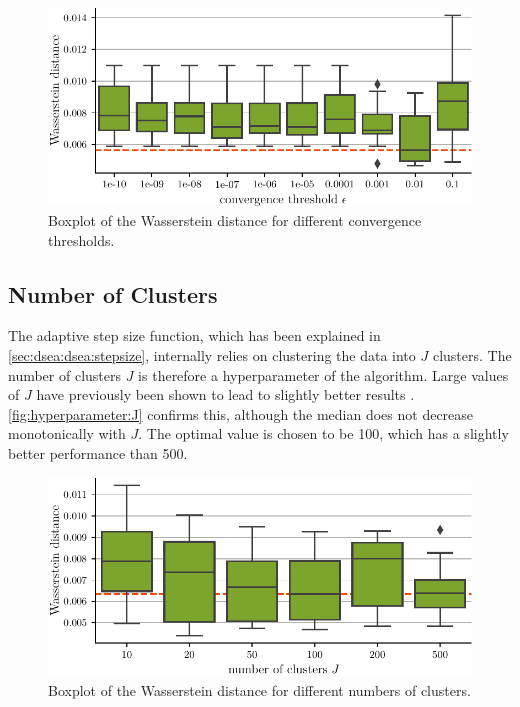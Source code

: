 \begin{figure}
  \centering
  \includegraphics[width=\textwidth]{content/plots/hyperparam/epsilon_vs_wd_boxplot_lessheight.pdf}
  \caption{Boxplot of the Wasserstein distance for different convergence thresholds.}
  \label{fig:hyperparameter:epsilon}
\end{figure}


\subsection{Number of Clusters}
The adaptive step size function,
  which has been explained in \autoref{sec:dsea:dsea:stepsize},
internally relies on clustering the data into $J$ clusters.
The number of clusters $J$ is therefore a hyperparameter of the algorithm.
%
Large values of $J$ have previously been shown to lead to slightly better results \cite{dsea_mirko}.
\autoref{fig:hyperparameter:J} confirms this,
although the median does not decrease monotonically with $J$.
The optimal value is chosen to be \num{100},
which has a slightly better performance than \num{500}.

\begin{figure}
  \centering
  \includegraphics[scale=1]{content/plots/hyperparam/J_vs_wd_boxplot_lessheight.pdf}
  \caption{Boxplot of the Wasserstein distance for different numbers of clusters.}
  \label{fig:hyperparameter:J}
\end{figure}


